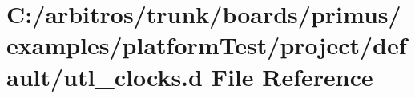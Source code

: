 \hypertarget{boards_2primus_2examples_2platform_test_2project_2default_2utl__clocks_8d}{\section{C\-:/arbitros/trunk/boards/primus/examples/platform\-Test/project/default/utl\-\_\-clocks.d File Reference}
\label{boards_2primus_2examples_2platform_test_2project_2default_2utl__clocks_8d}
}
